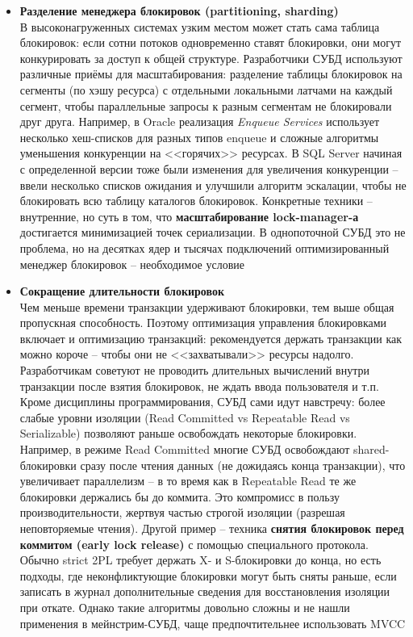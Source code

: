 \begin{itemize}
    \item \textbf{Разделение менеджера блокировок (partitioning, sharding)} ~\\
   В высоконагруженных системах узким местом может стать сама таблица блокировок: если сотни потоков одновременно ставят блокировки, они могут конкурировать за доступ к общей структуре. Разработчики СУБД используют различные приёмы для масштабирования: разделение таблицы блокировок на сегменты (по хэшу ресурса) с отдельными локальными латчами на каждый сегмент, чтобы параллельные запросы к разным сегментам не блокировали друг друга. Например, в Oracle реализация \textit{Enqueue Services} использует несколько хеш-списков для разных типов enqueue и сложные алгоритмы уменьшения конкуренции на <<горячих>> ресурсах. В SQL Server начиная с определенной версии тоже были изменения для увеличения конкуренции – ввели несколько списков ожидания и улучшили алгоритм эскалации, чтобы не блокировать всю таблицу каталогов блокировок. Конкретные техники – внутренние, но суть в том, что \textbf{масштабирование lock-manager-а} достигается минимизацией точек сериализации. В однопоточной СУБД это не проблема, но на десятках ядер и тысячах подключений оптимизированный менеджер блокировок – необходимое условие
    \item \textbf{Сокращение длительности блокировок} ~\\
    Чем меньше времени транзакции удерживают блокировки, тем выше общая пропускная способность. Поэтому оптимизация управления блокировками включает и оптимизацию транзакций: рекомендуется держать транзакции как можно короче – чтобы они не <<захватывали>> ресурсы надолго. Разработчикам советуют не проводить длительных вычислений внутри транзакции после взятия блокировок, не ждать ввода пользователя и т.п. Кроме дисциплины программирования, СУБД сами идут навстречу: более слабые уровни изоляции (Read Committed vs Repeatable Read vs Serializable) позволяют раньше освобождать некоторые блокировки. Например, в режиме Read Committed многие СУБД освобождают shared-блокировки сразу после чтения данных (не дожидаясь конца транзакции), что увеличивает параллелизм – в то время как в Repeatable Read те же блокировки держались бы до коммита. Это компромисс в пользу производительности, жертвуя частью строгой изоляции (разрешая неповторяемые чтения). Другой пример – техника \textbf{снятия блокировок перед коммитом (early lock release)} с помощью специального протокола. Обычно strict 2PL требует держать X- и S-блокировки до конца, но есть подходы, где неконфликтующие блокировки могут быть сняты раньше, если записать в журнал дополнительные сведения для восстановления изоляции при откате. Однако такие алгоритмы довольно сложны и не нашли применения в мейнстрим-СУБД, чаще предпочтительнее использовать MVCC

\end{itemize}

